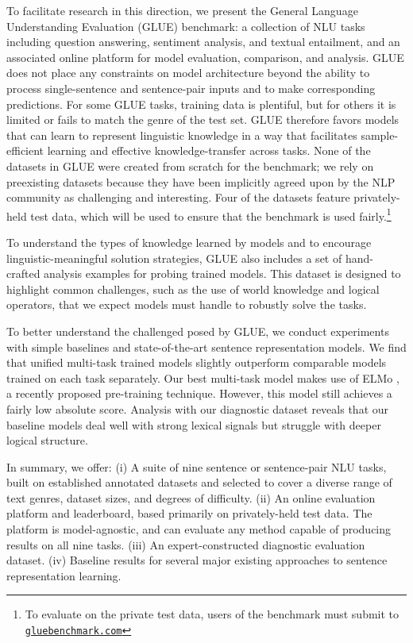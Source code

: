 To facilitate research in this direction, we present the General Language Understanding Evaluation 
(GLUE)
benchmark: a collection of NLU tasks including question answering, sentiment analysis, and textual entailment, and an associated online platform for model evaluation, comparison, and analysis.
GLUE does not place any constraints on model architecture beyond the ability to process single-sentence and sentence-pair inputs and to make corresponding predictions. 
For some GLUE tasks, training data is plentiful, but for others it is limited or fails to match the genre of the test set. GLUE therefore favors models that can learn to represent linguistic knowledge in a way that facilitates sample-efficient learning and effective knowledge-transfer across tasks. 
None of the datasets in GLUE were created from scratch for the benchmark; we rely on preexisting datasets because they have been implicitly agreed upon by the NLP community as challenging and interesting.
Four of the datasets feature privately-held test data, which will be used to ensure that the benchmark is used fairly.\footnote{To evaluate on the private test data, users of the benchmark must submit to \texttt{\href{gluebenchmark.com}{gluebenchmark.com}}}

To understand the types of knowledge learned by models and to encourage linguistic-meaningful solution strategies, GLUE also includes a set of hand-crafted analysis examples for probing trained models. 
This dataset is designed to highlight common challenges, such as the use of world knowledge and logical operators, that we expect models must handle to robustly solve the tasks.

To better understand the challenged posed by GLUE, we conduct experiments with simple baselines and state-of-the-art sentence representation models.
We find that unified multi-task trained models slightly outperform comparable models trained on each task separately.
Our best multi-task model makes use of ELMo \citep{peters2018deep},
a recently proposed pre-training technique.
However, this model still achieves a fairly low absolute score.
Analysis with our diagnostic dataset reveals that our baseline models deal well with strong lexical signals but struggle with deeper logical structure.

In summary, we offer: (i) A suite of nine sentence or sentence-pair NLU tasks, built on established annotated datasets and selected to cover a diverse range of text genres, dataset sizes, and degrees of difficulty. (ii) An online evaluation platform and leaderboard, based primarily on privately-held test data. The platform is model-agnostic, and can evaluate any method capable of producing results on all nine tasks. (iii) An expert-constructed diagnostic evaluation dataset. (iv) Baseline results for several major existing approaches to sentence representation learning.

